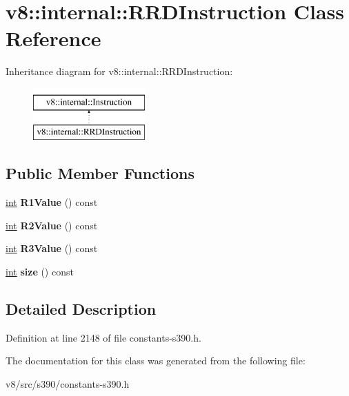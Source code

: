 \hypertarget{classv8_1_1internal_1_1RRDInstruction}{}\section{v8\+:\+:internal\+:\+:R\+R\+D\+Instruction Class Reference}
\label{classv8_1_1internal_1_1RRDInstruction}
Inheritance diagram for v8\+:\+:internal\+:\+:R\+R\+D\+Instruction\+:\begin{figure}[H]
\begin{center}
\leavevmode
\includegraphics[height=2.000000cm]{classv8_1_1internal_1_1RRDInstruction}
\end{center}
\end{figure}
\subsection*{Public Member Functions}
\begin{DoxyCompactItemize}
\item 
\mbox{\label{classv8_1_1internal_1_1RRDInstruction_a3f776f861f289bb275d8c060afd09d6f}} 
\mbox{\hyperlink{classint}{int}} {\bfseries R1\+Value} () const
\item 
\mbox{\label{classv8_1_1internal_1_1RRDInstruction_a1d4caa0f1209869b2740ecfdd746cd7c}} 
\mbox{\hyperlink{classint}{int}} {\bfseries R2\+Value} () const
\item 
\mbox{\label{classv8_1_1internal_1_1RRDInstruction_a1707a7fbce175869c373d18e4b680710}} 
\mbox{\hyperlink{classint}{int}} {\bfseries R3\+Value} () const
\item 
\mbox{\label{classv8_1_1internal_1_1RRDInstruction_a2115a912b9c9cae4b4169cce98858ac0}} 
\mbox{\hyperlink{classint}{int}} {\bfseries size} () const
\end{DoxyCompactItemize}


\subsection{Detailed Description}


Definition at line 2148 of file constants-\/s390.\+h.



The documentation for this class was generated from the following file\+:\begin{DoxyCompactItemize}
\item 
v8/src/s390/constants-\/s390.\+h\end{DoxyCompactItemize}
